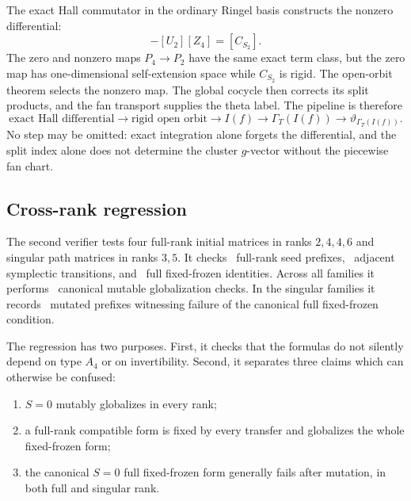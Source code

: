 The exact Hall commutator in the ordinary Ringel basis constructs the
nonzero differential:
\begin{equation}
 [Z_4][U_2]-[U_2][Z_4]=[C_{S_2}].
 \label{eq:A4-exact-Hall}
\end{equation}
The zero and nonzero maps $P_4\to P_2$ have the same exact term class, but the
zero map has one-dimensional self-extension space while $C_{S_2}$ is rigid.
The open-orbit theorem selects the nonzero map.  The global cocycle then
corrects its split products, and the fan transport supplies the theta label.
The pipeline is therefore
\[
 \text{exact Hall differential}
 \longrightarrow
 \text{rigid open orbit}
 \longrightarrow
 I(f)
 \longrightarrow
 \Gamma_T(I(f))
 \longrightarrow
 \vartheta_{\Gamma_T(I(f))}.
\]
No step may be omitted: exact integration alone forgets the differential,
and the split index alone does not determine the cluster $g$-vector without
the piecewise fan chart.

\subsection{Cross-rank regression}

The second verifier tests four full-rank initial matrices in ranks $2,4,4,6$
and singular path matrices in ranks $3,5$.  It checks
\CrossFullSeedChecks\ full-rank seed prefixes,
\CrossSymplecticChecks\ adjacent symplectic transitions,
and \CrossFullPrincipalChecks\ full fixed-frozen identities.  Across all
families it performs \CrossCanonicalMutableChecks\ canonical mutable
globalization checks.  In the singular families it records
\CrossSingularNoGoWitnesses\ mutated prefixes witnessing failure of the
canonical full fixed-frozen condition.

The regression has two purposes.  First, it checks that the formulas do not
silently depend on type $A_4$ or on invertibility.  Second, it separates three
claims which can otherwise be confused:
\begin{enumerate}[label=(\roman*),leftmargin=2.3em]
\item $S=0$ mutably globalizes in every rank;
\item a full-rank compatible form is fixed by every transfer and globalizes
the whole fixed-frozen form;
\item the canonical $S=0$ full fixed-frozen form generally fails after
mutation, in both full and singular rank.
\end{enumerate}

